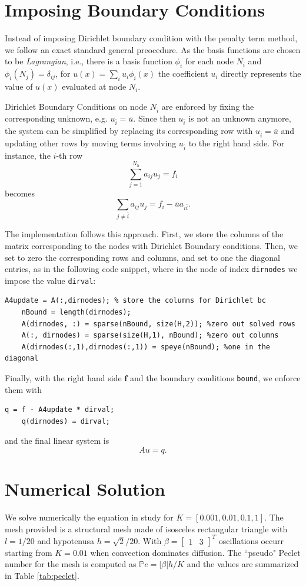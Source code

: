 \documentclass[hidelinks]{article}
\begin{document}
\section{Imposing Boundary Conditions}
Instead of imposing Dirichlet boundary condition with the penalty term method, we follow an exact standard general preocedure.
As the basis functions are chosen to be \emph{Lagrangian}, i.e., there is a basis function $\phi_i$ for each node $N_i$ and $\phi_i(N_j)=\delta_{ij}$, for $u(x) = \sum_i u_i\phi_i(x)$ the coefficient $u_i$ directly represents the value of $u(x)$ evaluated at node $N_i$.

Dirichlet Boundary Conditions on node $N_{\bar{i}}$ are enforced by fixing the corresponding unknown, e.g. $u_{\bar{i}}=\overline{u}$. Since then $u_{\bar{i}}$ is not an unknown anymore, the system can be simplified by replacing its corresponding row with $u_{\bar{i}}=\overline{u}$ and updating other rows by moving terms involving $u_{\bar{i}}$ to the right hand side. For instance, the $i$-th row
\[ \sum_{j=1}^{N_h}a_{ij}u_j = f_i\]
becomes
\[ \sum_{j\neq \bar{i}}a_{ij}u_j = f_i - \overline{u}a_{i\bar{i}}. \]

The implementation follows this approach. First, we store the columns of the matrix corresponding to the nodes with Dirichlet Boundary conditions. Then, we set to zero the corresponding rows and columns, and set to one the diagonal entries, as in the following code snippet, where in the node of index \texttt{dirnodes} we impose the value \texttt{dirval}:
\begin{lstlisting}[style=Matlab-editor]
    A4update = A(:,dirnodes); % store the columns for Dirichlet bc
    nBound = length(dirnodes);
    A(dirnodes, :) = sparse(nBound, size(H,2)); %zero out solved rows
    A(:, dirnodes) = sparse(size(H,1), nBound); %zero out columns
    A(dirnodes(:,1),dirnodes(:,1)) = speye(nBound); %one in the diagonal 
\end{lstlisting}
Finally, with the right hand side $\mathbf{f}$ and the boundary conditions \texttt{bound}, we enforce them with
\begin{lstlisting}[style=Matlab-editor]
    q = f - A4update * dirval; 
    q(dirnodes) = dirval; 
\end{lstlisting}
and the final linear system is \[ A u = q.\]

\section{Numerical Solution}
We solve numerically the equation in study for $K = [0.001, 0.01, 0.1, 1]$. The mesh provided is a structural mesh made of isosceles rectangular triangle with $l=1/20$ and hypotenusa $h= \sqrt{2}/20$. With $\beta = \begin{bmatrix}
    1 & 3
\end{bmatrix}^T $ oscillations occurr starting from $K = 0.01$ when convection dominates diffusion. The ``pseudo" Peclet number for the mesh is computed as $\mathbb{P}\!e =|\beta| h / K$ and the values are summarized in Table \ref{tab:peclet}.
\end{document}
